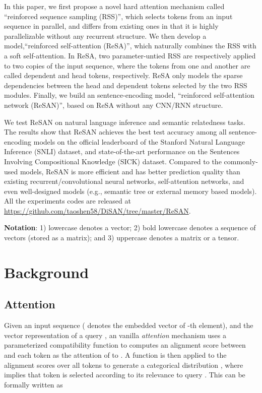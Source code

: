 \documentclass{article}
\begin{document}
In this paper, we first propose a novel hard attention mechanism called ``reinforced sequence sampling (RSS)'', which selects tokens from an input sequence in parallel, and differs from existing ones in that it is highly parallelizable without any recurrent structure. We then develop a model,``reinforced self-attention (ReSA)'', which naturally combines the RSS with a soft self-attention. In ReSA, two parameter-untied RSS  are respectively applied to two copies of the input sequence, where the tokens from one and another are called dependent and head tokens, respectively. ReSA only models the sparse dependencies between the head and dependent tokens selected by the two RSS modules. Finally, we build an sentence-encoding model, ``reinforced self-attention network (ReSAN)'',  based on ReSA without any CNN/RNN structure. 

We test ReSAN on natural language inference and semantic relatedness tasks. The results show that ReSAN achieves the best test accuracy among all sentence-encoding models on the official leaderboard of the Stanford Natural Language Inference (SNLI) dataset, and state-of-the-art performance on the Sentences Involving Compositional Knowledge (SICK) dataset. Compared to the commonly-used models, ReSAN is more efficient and has better prediction quality than existing recurrent/convolutional neural networks, self-attention networks, and even well-designed models (e.g., semantic tree or external memory based models). All the experiments codes are released at \url{https://github.com/taoshen58/DiSAN/tree/master/ReSAN}.

\textbf{Notation}: 1) lowercase denotes a vector; 2) bold lowercase denotes a sequence of vectors (stored as a matrix); and 3) uppercase denotes a matrix or a tensor.

\section{Background} \label{sec:background}

\subsection{Attention}
Given an input sequence  ( denotes the embedded vector of -th element), and the vector representation of a query , an vanilla \textit{attention} mechanism uses a parameterized compatibility function  to computes an alignment score between  and each token  as the attention of  to  \cite{bahdanau2015neural}. A  function is then applied to the alignment scores  over all tokens to generate a categorical distribution , where  implies that token  is selected according to its relevance to query . This can be formally written as 
\end{document}
